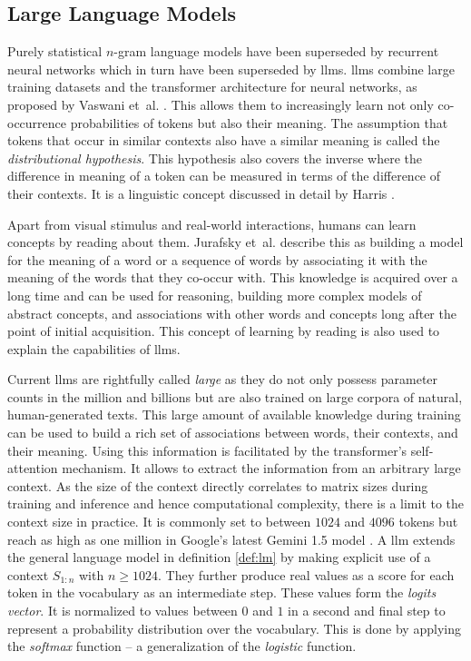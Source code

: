     \subsection{Large Language Models}
    Purely statistical $n$-gram language models have been superseded by recurrent neural networks which in turn have been superseded by \acfp{llm}.
    \acp{llm} combine large training datasets and the transformer architecture for neural networks, as proposed by Vaswani et~al. \cite{vaswani2023attention}.
    This allows them to increasingly learn not only co-occurrence probabilities of tokens but also their meaning.
    The assumption that tokens that occur in similar contexts also have a similar meaning is called the \emph{distributional hypothesis}.
    This hypothesis also covers the inverse where the difference in meaning of a token can be measured in terms of the difference of their contexts.
    It is a linguistic concept discussed in detail by Harris \cite{harris1954distributional}.

    Apart from visual stimulus and real-world interactions, humans can learn concepts by reading about them. 
    Jurafsky et~al. \cite{jurafsky2024speech} describe this as building a model for the meaning of a word or a sequence of words by associating it with the meaning of the words that they co-occur with.
    This knowledge is acquired over a long time and can be used for reasoning, building more complex models of abstract concepts, and associations with other words and concepts long after the point of initial acquisition.
    This concept of learning by reading is also used to explain the capabilities of \acp{llm}.
    
    Current \acp{llm} are rightfully called \emph{large} as they do not only possess parameter counts in the million and billions but are also trained on large corpora of natural, human-generated texts.
    This large amount of available knowledge during training can be used to build a rich set of associations between words, their contexts, and their meaning.
    Using this information is facilitated by the transformer's self-attention mechanism.
    It allows to extract the information from an arbitrary large context.
    As the size of the context directly correlates to matrix sizes during training and inference and hence computational complexity, there is a limit to the context size in practice.
    It is commonly set to between $1024$ and $4096$ tokens but reach as high as one million in Google's latest Gemini 1.5 model \cite{pichai2024model}.
    A \ac{llm} extends the general language model in definition \ref{def:lm} by making explicit use of a context $S_{1:n}$ with $n \geq 1024$.
    They further produce real values as a score for each token in the vocabulary as an intermediate step.
    These values form the \emph{logits vector}.
    It is normalized to values between $0$ and $1$ in a second and final step to represent a probability distribution over the vocabulary.
    This is done by applying the \emph{softmax} function -- a generalization of the \emph{logistic} function.

